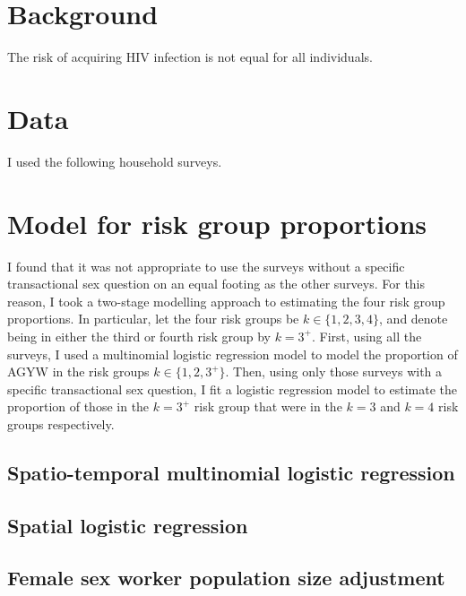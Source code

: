 \documentclass[a4paper, nobind]{templates/ociamthesis}
\begin{document}
\hypertarget{background-2}{%
\section{Background}\label{background-2}}

The risk of acquiring HIV infection is not equal for all individuals.

\hypertarget{data}{%
\section{Data}\label{data}}

I used the following household surveys.

\hypertarget{model-for-risk-group-proportions}{%
\section{Model for risk group proportions}\label{model-for-risk-group-proportions}}

I found that it was not appropriate to use the surveys without a specific transactional sex question on an equal footing as the other surveys.
For this reason, I took a two-stage modelling approach to estimating the four risk group proportions.
In particular, let the four risk groups be \(k \in \{1, 2, 3, 4\}\), and denote being in either the third or fourth risk group by \(k = 3^{+}\).
First, using all the surveys, I used a multinomial logistic regression model to model the proportion of AGYW in the risk groups \(k \in \{1, 2, 3^{+}\}\).
Then, using only those surveys with a specific transactional sex question, I fit a logistic regression model to estimate the proportion of those in the \(k = 3^{+}\) risk group that were in the \(k = 3\) and \(k = 4\) risk groups respectively.

\hypertarget{spatio-temporal-multinomial-logistic-regression}{%
\subsection{Spatio-temporal multinomial logistic regression}\label{spatio-temporal-multinomial-logistic-regression}}

\hypertarget{spatial-logistic-regression}{%
\subsection{Spatial logistic regression}\label{spatial-logistic-regression}}

\hypertarget{female-sex-worker-population-size-adjustment}{%
\subsection{Female sex worker population size adjustment}\label{female-sex-worker-population-size-adjustment}}
\end{document}
